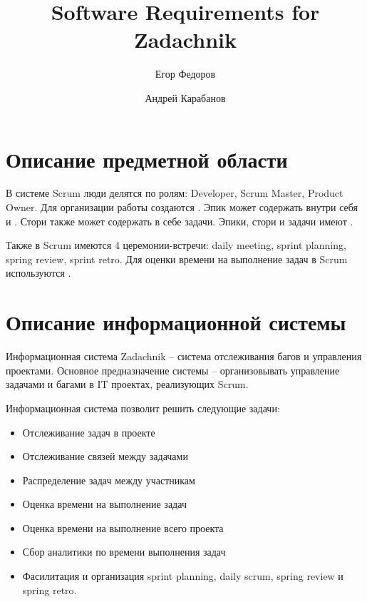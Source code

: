\documentclass{article}
\author{Егор Федоров \and Андрей Карабанов}
\title{Software Requirements for Zadachnik}
\begin{document}

\tableofcontents

\section{Описание предметной области}
В системе Scrum люди делятся по ролям:
Developer, Scrum Master, Product Owner.
Для организации работы создаются .
Эпик может содержать внутри себя  и
. Стори также может содержать в себе задачи.
Эпики, стори и задачи имеют .

Также в Scrum имеются 4 церемонии-встречи: daily meeting, sprint
planning, spring review, sprint retro.
Для оценки времени на выполнение задач в Scrum используются .


\section{Описание информационной системы}
Информационная система Zadachnik -- система отслеживания багов и
управления проектами.
Основное предназначение системы -- организовывать управление задачами и багами
в IT проектах, реализующих Scrum.

Информационная система позволит решить следующие задачи:
\begin{itemize}
  \item Отслеживание задач в проекте
  \item Отслеживание связей между задачами
  \item Распределение задач между участникам
  \item Оценка времени на выполнение задач
  \item Оценка времени на выполнение всего проекта
  \item Сбор аналитики по времени выполнения задач
  \item Фасилитация и организация sprint planning, daily scrum, spring review и spring retro.
\end{itemize}
\end{document}
